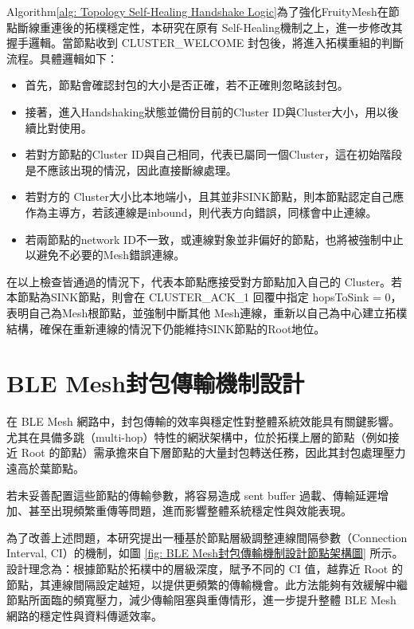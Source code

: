 \begin{ZhChapter}
Algorithm\ref{alg: Topology Self-Healing Handshake Logic}為了強化FruityMesh在節點斷線重連後的拓樸穩定性，本研究在原有 Self-Healing機制之上，進一步修改其握手邏輯。當節點收到 CLUSTER\_WELCOME 封包後，將進入拓樸重組的判斷流程。具體邏輯如下：

\begin{itemize}
    \item 首先，節點會確認封包的大小是否正確，若不正確則忽略該封包。
    \item 接著，進入Handshaking狀態並備份目前的Cluster ID與Cluster大小，用以後續比對使用。
    \item 若對方節點的Cluster ID與自己相同，代表已屬同一個Cluster，這在初始階段是不應該出現的情況，因此直接斷線處理。
    \item 若對方的 Cluster大小比本地端小，且其並非SINK節點，則本節點認定自己應作為主導方，若該連線是inbound，則代表方向錯誤，同樣會中止連線。
    \item 若兩節點的network ID不一致，或連線對象並非偏好的節點，也將被強制中止以避免不必要的Mesh錯誤連線。
\end{itemize}

在以上檢查皆通過的情況下，代表本節點應接受對方節點加入自己的 Cluster。若本節點為SINK節點，則會在 CLUSTER\_ACK\_1 回覆中指定 hopsToSink = 0，表明自己為Mesh根節點，並強制中斷其他 Mesh連線，重新以自己為中心建立拓樸結構，確保在重新連線的情況下仍能維持SINK節點的Root地位。

\section{BLE Mesh封包傳輸機制設計}
在 BLE Mesh 網路中，封包傳輸的效率與穩定性對整體系統效能具有關鍵影響。尤其在具備多跳（multi-hop）特性的網狀架構中，位於拓樸上層的節點（例如接近 Root 的節點）需承擔來自下層節點的大量封包轉送任務，因此其封包處理壓力遠高於葉節點。

若未妥善配置這些節點的傳輸參數，將容易造成 sent buffer 過載、傳輸延遲增加、甚至出現頻繁重傳等問題，進而影響整體系統穩定性與效能表現。

為了改善上述問題，本研究提出一種基於節點層級調整連線間隔參數（Connection Interval, CI）的機制，如圖 \ref{fig: BLE Mesh封包傳輸機制設計節點架構圖} 所示。設計理念為：根據節點於拓樸中的層級深度，賦予不同的 CI 值，越靠近 Root 的節點，其連線間隔設定越短，以提供更頻繁的傳輸機會。此方法能夠有效緩解中繼節點所面臨的頻寬壓力，減少傳輸阻塞與重傳情形，進一步提升整體 BLE Mesh 網路的穩定性與資料傳遞效率。


\end{ZhChapter}
